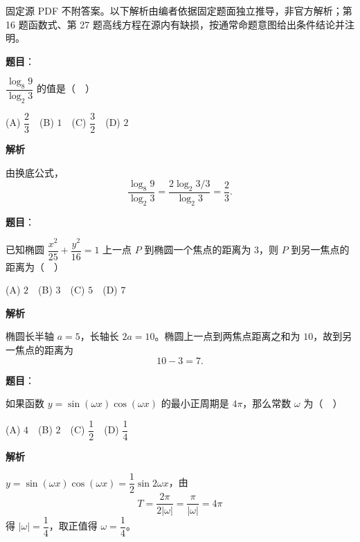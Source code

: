 

\begin{gktip}
固定源 PDF 不附答案。以下解析由编者依据固定题面独立推导，非官方解析；第 16 题函数式、第 27 题高线方程在源内有缺损，按通常命题意图给出条件结论并注明。
\end{gktip}

\begin{answer}

\textbf{题目}：

\(\dfrac{\log_8 9}{\log_2 3}\) 的值是（　）

(A) \(\dfrac{2}{3}\)　(B) \(1\)　(C) \(\dfrac{3}{2}\)　(D) \(2\)

\textbf{解析}

由换底公式，
\nopagebreak[4]
\[
\frac{\log_8 9}{\log_2 3}
=\frac{2\log_2 3/3}{\log_2 3}=\frac23.
\]


\end{answer}
\begin{answer}

\textbf{题目}：

已知椭圆 \(\dfrac{x^2}{25}+\dfrac{y^2}{16}=1\) 上一点 \(P\) 到椭圆一个焦点的距离为 \(3\)，则 \(P\) 到另一焦点的距离为（　）

(A) \(2\)　(B) \(3\)　(C) \(5\)　(D) \(7\)

\textbf{解析}

椭圆长半轴 \(a=5\)，长轴长 \(2a=10\)。椭圆上一点到两焦点距离之和为 \(10\)，故到另一焦点的距离为
\nopagebreak[4]
\[
10-3=7.
\]


\end{answer}
\begin{answer}

\textbf{题目}：

如果函数 \(y=\sin(\omega x)\cos(\omega x)\) 的最小正周期是 \(4\pi\)，那么常数 \(\omega\) 为（　）

(A) \(4\)　(B) \(2\)　(C) \(\dfrac{1}{2}\)　(D) \(\dfrac{1}{4}\)

\textbf{解析}

\(y=\sin(\omega x)\cos(\omega x)=\dfrac12\sin2\omega x\)，由
\nopagebreak[4]
\[
T=\frac{2\pi}{2|\omega|}=\frac{\pi}{|\omega|}=4\pi
\]
得 \(|\omega|=\dfrac14\)，取正值得 \(\omega=\dfrac14\)。


\end{answer}
